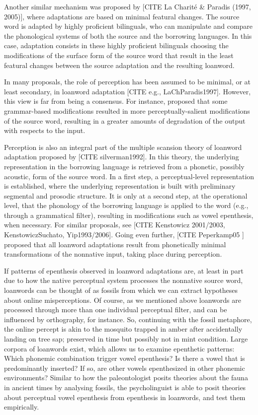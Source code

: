 Another similar mechanism was proposed by [CITE La Charité \& Paradis (1997, 2005)], where adaptations are based on minimal featural changes. The source word is adapted by highly proficient bilinguals, who can manipulate and compare the phonological systems of both the source and the borrowing languages. In this case, adaptation consists in these highly proficient bilinguals choosing the modifications of the surface form of the source word that result in the least featural changes between the source adaptation and the resulting loanword.  

In many proposals, the role of perception has been assumed to be minimal, or at least secondary, in loanword adaptation [CITE e.g., LaChParadis1997]. However, this view is far from being a consensus. For instance, \cite{steriade2001} proposed that some grammar-based modifications resulted in more perceptually-salient modifications of the source word, resulting in a greater amounts of degradation of the output with respects to the input.

Perception is also an integral part of the multiple scansion theory of loanword adaptation proposed by [CITE silverman1992]. In this theory, the underlying representation in the borrowing language is retrieved from a phonetic, possibly acoustic, form of the source word. In a first step, a perceptual-level representation is established, where the underlying representation is built with preliminary segmental and prosodic structure. It is only at a second step, at the operational level, that the phonology of the borrowing language is applied to the word (e.g., through a grammatical filter), resulting in modifications such as vowel epenthesis, when necessary. For similar proposals, see [CITE Kenstowicz 2001/2003, KenstowiczSuchato, Yip1993/2006].
Going even further, [CITE Peperkamp05 \cite{peperkamp2005}] proposed that all loanword adaptations result from phonetically minimal transformations of the nonnative input, taking place during perception.

If patterns of epenthesis observed in loanword adaptations are, at least in part due to how the native perceptual system processes the nonnative source word, loanwords can be thought of as fossils from which we can extract hypotheses about online misperceptions. Of course, as we mentioned above loanwords are processed through more than one individual perceptual filter, and can be influenced by orthography, for instance. So, continuing with the fossil metaphore, the online percept is akin to the mosquito trapped in amber after accidentally landing on tree sap; preserved in time but possibly not in mint condition. Large corpora of loanwords exist, which allows us to examine epenthetic patterns: Which phonemic combination trigger vowel epenthesis? Is there a vowel that is predominantly inserted? If so, are other vowels epenthesized in other phonemic environments? Similar to how the paleontologist posits theories about the fauna in ancient times by analysing fossils, the psycholinguist is able to posit theories about perceptual vowel epenthesis from epenthesis in loanwords, and test them empirically.      

